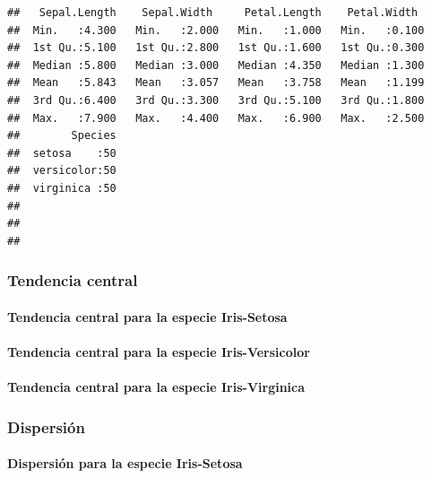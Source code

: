 \documentclass[11pt,]{article}
\let\oldparagraph\paragraph
\renewcommand{\paragraph}[1]{\oldparagraph{#1}\mbox{}}
\begin{document}
\begin{verbatim}
##   Sepal.Length    Sepal.Width     Petal.Length    Petal.Width   
##  Min.   :4.300   Min.   :2.000   Min.   :1.000   Min.   :0.100  
##  1st Qu.:5.100   1st Qu.:2.800   1st Qu.:1.600   1st Qu.:0.300  
##  Median :5.800   Median :3.000   Median :4.350   Median :1.300  
##  Mean   :5.843   Mean   :3.057   Mean   :3.758   Mean   :1.199  
##  3rd Qu.:6.400   3rd Qu.:3.300   3rd Qu.:5.100   3rd Qu.:1.800  
##  Max.   :7.900   Max.   :4.400   Max.   :6.900   Max.   :2.500  
##        Species  
##  setosa    :50  
##  versicolor:50  
##  virginica :50  
##                 
##                 
## 
\end{verbatim}

\hypertarget{tendencia-central}{%
\subsubsection{Tendencia central}\label{tendencia-central}}

\hypertarget{tendencia-central-para-la-especie-iris-setosa}{%
\paragraph{Tendencia central para la especie
Iris-Setosa}\label{tendencia-central-para-la-especie-iris-setosa}}

\hypertarget{tendencia-central-para-la-especie-iris-versicolor}{%
\paragraph{Tendencia central para la especie
Iris-Versicolor}\label{tendencia-central-para-la-especie-iris-versicolor}}

\hypertarget{tendencia-central-para-la-especie-iris-virginica}{%
\paragraph{Tendencia central para la especie
Iris-Virginica}\label{tendencia-central-para-la-especie-iris-virginica}}

\hypertarget{dispersiuxf3n}{%
\subsubsection{Dispersión}\label{dispersiuxf3n}}

\hypertarget{dispersiuxf3n-para-la-especie-iris-setosa}{%
\paragraph{Dispersión para la especie
Iris-Setosa}\label{dispersiuxf3n-para-la-especie-iris-setosa}}
\end{document}
